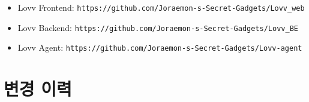 \documentclass[12pt,a4paper]{article}
\newcommand{\DocNeedspace}[1]{\par\ifdim\dimexpr\pagegoal-\pagetotal\relax<#1\newpage\fi}
\newcommand{\TocNoChildTight}{\vspace{-0.28em}}
\begin{document}
\begin{itemize}
\item Lovv Frontend: \texttt{https:\allowbreak{}/\allowbreak{}/\allowbreak{}github.\allowbreak{}com/\allowbreak{}Joraemon-\allowbreak{}s-\allowbreak{}Secret-\allowbreak{}Gadgets/\allowbreak{}Lovv\_\allowbreak{}web}
\item Lovv Backend: \texttt{https:\allowbreak{}/\allowbreak{}/\allowbreak{}github.\allowbreak{}com/\allowbreak{}Joraemon-\allowbreak{}s-\allowbreak{}Secret-\allowbreak{}Gadgets/\allowbreak{}Lovv\_\allowbreak{}BE}
\item Lovv Agent: \texttt{https:\allowbreak{}/\allowbreak{}/\allowbreak{}github.\allowbreak{}com/\allowbreak{}Joraemon-\allowbreak{}s-\allowbreak{}Secret-\allowbreak{}Gadgets/\allowbreak{}Lovv-\allowbreak{}agent}
\end{itemize}


\newpage

\DocNeedspace{10\baselineskip}
\section*{변경 이력}
\addtocontents{toc}{\protect\TocNoChildTight}
\end{document}
